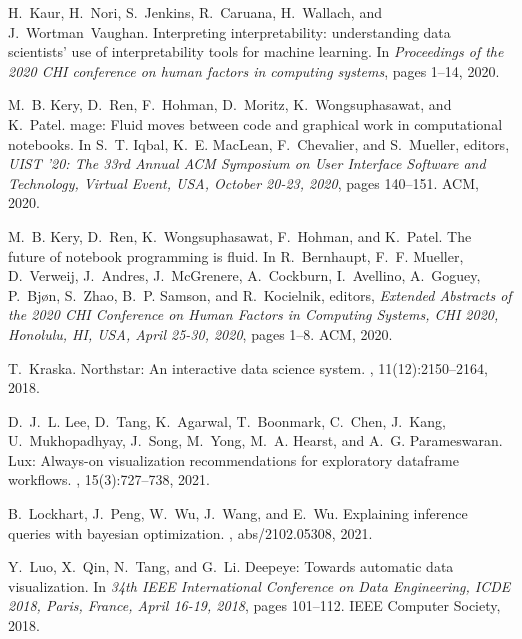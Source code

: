 \documentclass[11pt]{article}
\begin{document}
\begin{thebibliography}{10}
\begin{small}
H.~Kaur, H.~Nori, S.~Jenkins, R.~Caruana, H.~Wallach, and J.~Wortman~Vaughan.
\newblock Interpreting interpretability: understanding data scientists' use of
  interpretability tools for machine learning.
\newblock In {\em Proceedings of the 2020 CHI conference on human factors in
  computing systems}, pages 1--14, 2020.

M.~B. Kery, D.~Ren, F.~Hohman, D.~Moritz, K.~Wongsuphasawat, and K.~Patel.
\newblock mage: Fluid moves between code and graphical work in computational
  notebooks.
\newblock In S.~T. Iqbal, K.~E. MacLean, F.~Chevalier, and S.~Mueller, editors,
  {\em {UIST} '20: The 33rd Annual {ACM} Symposium on User Interface Software
  and Technology, Virtual Event, USA, October 20-23, 2020}, pages 140--151.
  {ACM}, 2020.

M.~B. Kery, D.~Ren, K.~Wongsuphasawat, F.~Hohman, and K.~Patel.
\newblock The future of notebook programming is fluid.
\newblock In R.~Bernhaupt, F.~F. Mueller, D.~Verweij, J.~Andres, J.~McGrenere,
  A.~Cockburn, I.~Avellino, A.~Goguey, P.~Bj{\o}n, S.~Zhao, B.~P. Samson, and
  R.~Kocielnik, editors, {\em Extended Abstracts of the 2020 {CHI} Conference
  on Human Factors in Computing Systems, {CHI} 2020, Honolulu, HI, USA, April
  25-30, 2020}, pages 1--8. {ACM}, 2020.

T.~Kraska.
\newblock Northstar: An interactive data science system.
, 11(12):2150--2164, 2018.

D.~J.~L. Lee, D.~Tang, K.~Agarwal, T.~Boonmark, C.~Chen, J.~Kang,
  U.~Mukhopadhyay, J.~Song, M.~Yong, M.~A. Hearst, and A.~G. Parameswaran.
\newblock Lux: Always-on visualization recommendations for exploratory
  dataframe workflows.
, 15(3):727--738, 2021.

B.~Lockhart, J.~Peng, W.~Wu, J.~Wang, and E.~Wu.
\newblock Explaining inference queries with bayesian optimization.
, abs/2102.05308, 2021.

Y.~Luo, X.~Qin, N.~Tang, and G.~Li.
\newblock Deepeye: Towards automatic data visualization.
\newblock In {\em 34th {IEEE} International Conference on Data Engineering,
  {ICDE} 2018, Paris, France, April 16-19, 2018}, pages 101--112. {IEEE}
  Computer Society, 2018.


\end{small}
\end{thebibliography}
\end{document}
